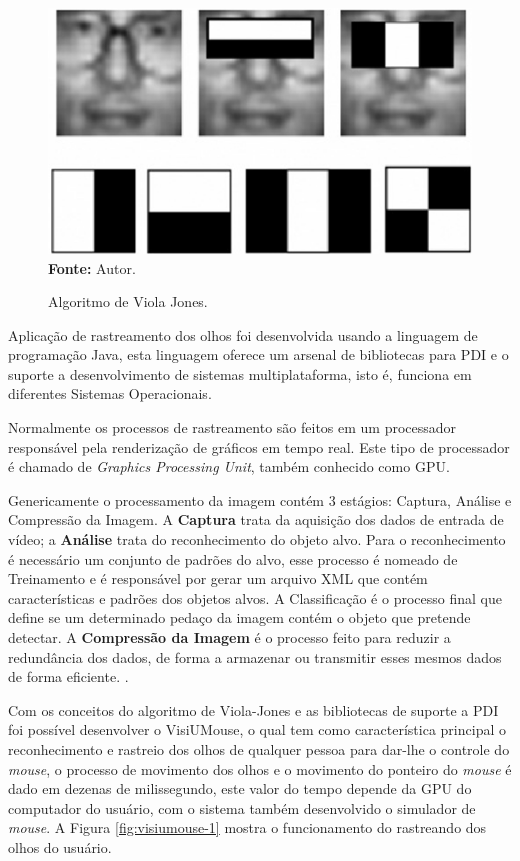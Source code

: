 \begin{figure}[htbp]
\caption{Algoritmo de Viola Jones.} 
\centering \includegraphics[scale=1]{img/viola-jones-ret.png}
\textbf{Fonte:} Autor.
\label{fig:viola-jones-ret}
\end{figure}

Aplicação de rastreamento dos olhos foi desenvolvida usando a linguagem de programação Java, esta linguagem oferece um arsenal de bibliotecas para PDI e o suporte a desenvolvimento de sistemas multiplataforma, isto é, funciona em diferentes Sistemas Operacionais. 

Normalmente os processos de rastreamento são feitos em um processador responsável pela renderização de gráficos em tempo real. Este tipo de processador é chamado de \textit{Graphics Processing Unit}, também conhecido como GPU.

Genericamente o processamento da imagem contém 3 estágios: Captura, Análise e Compressão da Imagem. A \textbf{Captura} trata da aquisição dos dados de entrada de vídeo; a \textbf{Análise} trata do reconhecimento do objeto alvo. Para o reconhecimento é necessário um conjunto de padrões do alvo, esse processo é nomeado de Treinamento e é responsável por gerar um arquivo XML que contém características e padrões dos objetos alvos. A Classificação é o processo final que define se um determinado pedaço da imagem contém o objeto que pretende detectar. A \textbf{Compressão da Imagem} é o processo feito para reduzir a redundância dos dados, de forma a armazenar ou transmitir esses mesmos dados de forma eficiente. .

Com os conceitos do algoritmo de Viola-Jones e as bibliotecas de suporte a PDI foi possível desenvolver o VisiUMouse, o qual tem como característica principal o reconhecimento e rastreio dos olhos de qualquer pessoa para dar-lhe o controle do \textit{mouse}, o processo de movimento dos olhos e o movimento do ponteiro do \textit{mouse} é dado em dezenas de milissegundo, este valor do tempo depende da GPU do computador do usuário, com o sistema também desenvolvido o simulador de \textit{mouse}. A Figura \ref{fig:visiumouse-1} mostra o funcionamento do rastreando dos olhos do usuário.

